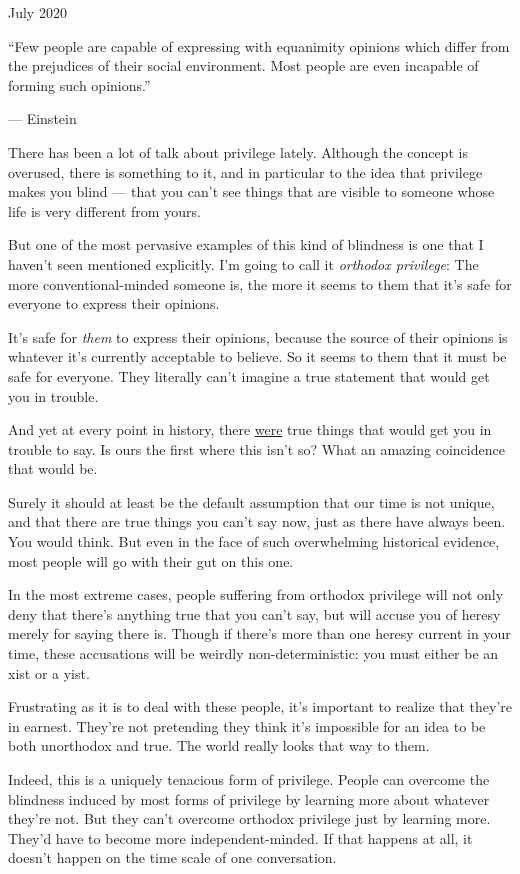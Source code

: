 July 2020

``Few people are capable of expressing with equanimity opinions which
differ from the prejudices of their social environment. Most people are
even incapable of forming such opinions.''

--- Einstein

There has been a lot of talk about privilege lately. Although the
concept is overused, there is something to it, and in particular to the
idea that privilege makes you blind --- that you can't see things that
are visible to someone whose life is very different from yours.

But one of the most pervasive examples of this kind of blindness is one
that I haven't seen mentioned explicitly. I'm going to call it
\emph{orthodox privilege}: The more conventional-minded someone is, the
more it seems to them that it's safe for everyone to express their
opinions.

It's safe for \emph{them} to express their opinions, because the source
of their opinions is whatever it's currently acceptable to believe. So
it seems to them that it must be safe for everyone. They literally can't
imagine a true statement that would get you in trouble.

And yet at every point in history, there \href{say.html}{were} true
things that would get you in trouble to say. Is ours the first where
this isn't so? What an amazing coincidence that would be.

Surely it should at least be the default assumption that our time is not
unique, and that there are true things you can't say now, just as there
have always been. You would think. But even in the face of such
overwhelming historical evidence, most people will go with their gut on
this one.

In the most extreme cases, people suffering from orthodox privilege will
not only deny that there's anything true that you can't say, but will
accuse you of heresy merely for saying there is. Though if there's more
than one heresy current in your time, these accusations will be weirdly
non-deterministic: you must either be an xist or a yist.

Frustrating as it is to deal with these people, it's important to
realize that they're in earnest. They're not pretending they think it's
impossible for an idea to be both unorthodox and true. The world really
looks that way to them.

Indeed, this is a uniquely tenacious form of privilege. People can
overcome the blindness induced by most forms of privilege by learning
more about whatever they're not. But they can't overcome orthodox
privilege just by learning more. They'd have to become more
independent-minded. If that happens at all, it doesn't happen on the
time scale of one conversation.


